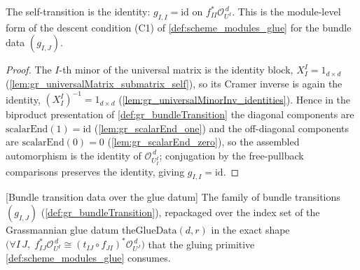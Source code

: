 \begin{lemma}
  \label{lem:gr_bundleCocycle_id}
  The self-transition is the identity: \(g_{I,I} = \mathrm{id}\) on
  \(f_{II}^{*}\mathcal{O}_{U^I}^{\,d}\). This is the module-level form of the descent
  condition (C1) of \cref{def:scheme_modules_glue} for the bundle data \((g_{I,J})\).
\end{lemma}
\begin{proof}
  The \(I\)-th minor of the universal matrix is the identity block, \(X^I_I = 1_{d\times d}\)
  (\cref{lem:gr_universalMatrix_submatrix_self}), so its Cramer inverse is again the
  identity, \((X^I_I)^{-1} = 1_{d\times d}\) (\cref{lem:gr_universalMinorInv_identities}).
  Hence in the biproduct presentation of \cref{def:gr_bundleTransition} the diagonal
  components are \(\mathrm{scalarEnd}(1) = \mathrm{id}\) (\cref{lem:gr_scalarEnd_one}) and the
  off-diagonal components are \(\mathrm{scalarEnd}(0) = 0\) (\cref{lem:gr_scalarEnd_zero}), so
  the assembled automorphism is the identity of \(\mathcal{O}_{U^I_I}^{\,d}\); conjugation by
  the free-pullback comparisons preserves the identity, giving \(g_{I,I} = \mathrm{id}\).
\end{proof}

\begin{definition}

[Bundle transition data over the glue datum]
  \label{def:gr_bundleTransitionData}
  The family of bundle transitions \((g_{I,J})\) (\cref{def:gr_bundleTransition}), repackaged
  over the index set of the Grassmannian glue datum \(\mathrm{theGlueData}(d,r)\) in the exact
  shape \(\bigl(\forall I\,J,\; f_{IJ}^{*}\mathcal{O}_{U^I}^{\,d} \cong (t_{IJ} \circ
  f_{JI})^{*}\mathcal{O}_{U^J}^{\,d}\bigr)\) that the gluing primitive
  \cref{def:scheme_modules_glue} consumes.
\end{definition}

